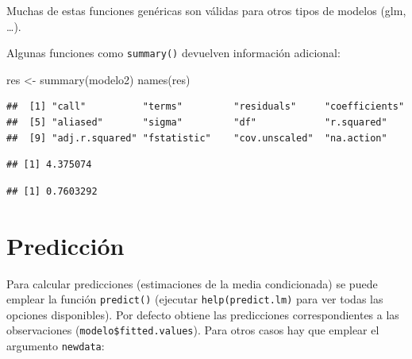 \documentclass[
]{book}
\newenvironment{Shaded}{\begin{snugshade}}{\end{snugshade}}
\newcommand{\FunctionTok}[1]{\textcolor[rgb]{0.00,0.00,0.00}{#1}}
\newcommand{\NormalTok}[1]{#1}
\newcommand{\OtherTok}[1]{\textcolor[rgb]{0.56,0.35,0.01}{#1}}
\newcommand{\SpecialCharTok}[1]{\textcolor[rgb]{0.00,0.00,0.00}{#1}}
\theoremstyle{break}
\begin{document}
Muchas de estas funciones genéricas son válidas para otros tipos de
modelos (glm, \ldots).

Algunas funciones como \texttt{summary()} devuelven información adicional:

\begin{Shaded}
\begin{Highlighting}[]
\NormalTok{res }\OtherTok{\textless{}{-}} \FunctionTok{summary}\NormalTok{(modelo2)}
\FunctionTok{names}\NormalTok{(res)}
\end{Highlighting}
\end{Shaded}

\begin{verbatim}
##  [1] "call"          "terms"         "residuals"     "coefficients" 
##  [5] "aliased"       "sigma"         "df"            "r.squared"    
##  [9] "adj.r.squared" "fstatistic"    "cov.unscaled"  "na.action"
\end{verbatim}

\begin{Shaded}
\end{Shaded}

\begin{verbatim}
## [1] 4.375074
\end{verbatim}

\begin{Shaded}
\end{Shaded}

\begin{verbatim}
## [1] 0.7603292
\end{verbatim}

\hypertarget{predicciuxf3n}{%
\section{Predicción}\label{predicciuxf3n}}

Para calcular predicciones (estimaciones de la media condicionada) se puede emplear la función \texttt{predict()} (ejecutar \texttt{help(predict.lm)} para ver todas las opciones disponibles).
Por defecto obtiene las predicciones correspondientes a las observaciones (\texttt{modelo\$fitted.values}). Para otros casos hay que emplear el argumento \texttt{newdata}:
\end{document}
